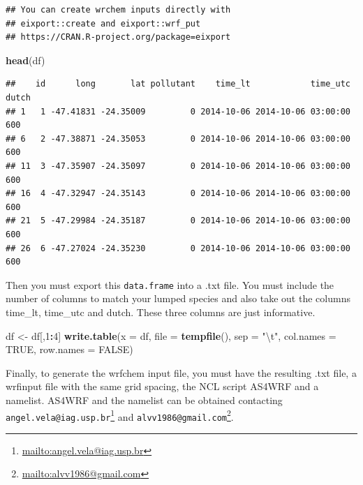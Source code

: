 \documentclass[12pt,graybox,envcountchap,sectrefs]{krantz}
\makeatletter
\newenvironment{Shaded}{\begin{snugshade}}{\end{snugshade}}
\newcommand{\KeywordTok}[1]{\textcolor[rgb]{0.13,0.29,0.53}{\textbf{#1}}}
\newcommand{\DataTypeTok}[1]{\textcolor[rgb]{0.13,0.29,0.53}{#1}}
\newcommand{\DecValTok}[1]{\textcolor[rgb]{0.00,0.00,0.81}{#1}}
\newcommand{\CharTok}[1]{\textcolor[rgb]{0.31,0.60,0.02}{#1}}
\newcommand{\StringTok}[1]{\textcolor[rgb]{0.31,0.60,0.02}{#1}}
\newcommand{\OtherTok}[1]{\textcolor[rgb]{0.56,0.35,0.01}{#1}}
\newcommand{\OperatorTok}[1]{\textcolor[rgb]{0.81,0.36,0.00}{\textbf{#1}}}
\newcommand{\NormalTok}[1]{#1}
\renewcommand{\href}[2]{#2\footnote{\url{#1}}}
\newenvironment{kframe}{%
\medskip{}
\setlength{\fboxsep}{.8em}
 \def\at@end@of@kframe{}%
 \ifinner\ifhmode%
  \def\at@end@of@kframe{\end{minipage}}%
  \begin{minipage}{\columnwidth}%
 \fi\fi%
 \def\FrameCommand##1{\hskip\@totalleftmargin \hskip-\fboxsep
 \colorbox{shadecolor}{##1}\hskip-\fboxsep
     \hskip-\linewidth \hskip-\@totalleftmargin \hskip\columnwidth}%
 \MakeFramed {\advance\hsize-\width
   \@totalleftmargin\z@ \linewidth\hsize
   \@setminipage}}%
 {\par\unskip\endMakeFramed%
 \at@end@of@kframe}
\renewenvironment{Shaded}{\begin{kframe}}{\end{kframe}}
\theoremstyle{definition}
\theoremstyle{definition}
\theoremstyle{definition}
\theoremstyle{remark}
\makeatother
\begin{document}
\begin{verbatim}
## You can create wrchem inputs directly with 
## eixport::create and eixport::wrf_put
## https://CRAN.R-project.org/package=eixport
\end{verbatim}

\begin{Shaded}
\begin{Highlighting}[]
\KeywordTok{head}\NormalTok{(df)}
\end{Highlighting}
\end{Shaded}

\begin{verbatim}
##    id      long       lat pollutant    time_lt            time_utc dutch
## 1   1 -47.41831 -24.35009         0 2014-10-06 2014-10-06 03:00:00   600
## 6   2 -47.38871 -24.35053         0 2014-10-06 2014-10-06 03:00:00   600
## 11  3 -47.35907 -24.35097         0 2014-10-06 2014-10-06 03:00:00   600
## 16  4 -47.32947 -24.35143         0 2014-10-06 2014-10-06 03:00:00   600
## 21  5 -47.29984 -24.35187         0 2014-10-06 2014-10-06 03:00:00   600
## 26  6 -47.27024 -24.35230         0 2014-10-06 2014-10-06 03:00:00   600
\end{verbatim}

Then you must export this \texttt{data.frame} into a .txt file. You must
include the number of columns to match your lumped species and also take
out the columns time\_lt, time\_utc and dutch. These three columns are
just informative.

\begin{Shaded}
\begin{Highlighting}[]
\NormalTok{df <-}\StringTok{ }\NormalTok{df[,}\DecValTok{1}\OperatorTok{:}\DecValTok{4}\NormalTok{]}
\KeywordTok{write.table}\NormalTok{(}\DataTypeTok{x =}\NormalTok{ df, }\DataTypeTok{file =} \KeywordTok{tempfile}\NormalTok{(), }\DataTypeTok{sep =} \StringTok{"}\CharTok{\textbackslash{}t}\StringTok{"}\NormalTok{,}
            \DataTypeTok{col.names =} \OtherTok{TRUE}\NormalTok{, }\DataTypeTok{row.names =} \OtherTok{FALSE}\NormalTok{)}
\end{Highlighting}
\end{Shaded}

Finally, to generate the wrfchem input file, you must have the resulting
.txt file, a wrfinput file with the same grid spacing, the NCL script
AS4WRF and a namelist. AS4WRF and the namelist can be obtained
contacting
\href{mailto:angel.vela@iag.usp.br}{\nolinkurl{angel.vela@iag.usp.br}}
and \href{mailto:alvv1986@gmail.com}{\nolinkurl{alvv1986@gmail.com}}.
\end{document}

